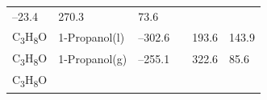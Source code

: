 \documentclass[
  9pt,
]{extbook}
\theoremstyle{definition}
\theoremstyle{definition}
\theoremstyle{definition}
\theoremstyle{remark}
\begin{document}
\begin{longtable}[]{@{}llllll@{}}
\begin{minipage}[t]{0.15\columnwidth}
--23.4\strut
\end{minipage} & \begin{minipage}[t]{0.14\columnwidth}\raggedright
270.3\strut
\end{minipage} & \begin{minipage}[t]{0.14\columnwidth}\raggedright
73.6\strut
\end{minipage}\tabularnewline
\begin{minipage}[t]{0.07\columnwidth}\raggedright
C\textsubscript{3}H\textsubscript{8}O\strut
\end{minipage} & \begin{minipage}[t]{0.17\columnwidth}\raggedright
1-Propanol(l)\strut
\end{minipage} & \begin{minipage}[t]{0.15\columnwidth}\raggedright
--302.6\strut
\end{minipage} & \begin{minipage}[t]{0.15\columnwidth}\raggedright
\strut
\end{minipage} & \begin{minipage}[t]{0.14\columnwidth}\raggedright
193.6\strut
\end{minipage} & \begin{minipage}[t]{0.14\columnwidth}\raggedright
143.9\strut
\end{minipage}\tabularnewline
\begin{minipage}[t]{0.07\columnwidth}\raggedright
C\textsubscript{3}H\textsubscript{8}O\strut
\end{minipage} & \begin{minipage}[t]{0.17\columnwidth}\raggedright
1-Propanol(g)\strut
\end{minipage} & \begin{minipage}[t]{0.15\columnwidth}\raggedright
--255.1\strut
\end{minipage} & \begin{minipage}[t]{0.15\columnwidth}\raggedright
\strut
\end{minipage} & \begin{minipage}[t]{0.14\columnwidth}\raggedright
322.6\strut
\end{minipage} & \begin{minipage}[t]{0.14\columnwidth}\raggedright
85.6\strut
\end{minipage}\tabularnewline
\begin{minipage}[t]{0.07\columnwidth}\raggedright
C\textsubscript{3}H\textsubscript{8}O\strut
\end{minipage} & \begin{minipage}[t]{0.17\columnwidth}\raggedright

\end{minipage}
\end{longtable}
\end{document}
